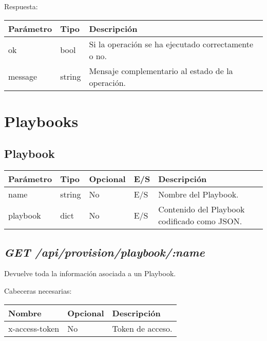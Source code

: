 Respuesta:
\begin{table}[!h]
	\centering
	\begin{adjustbox}{max width=\textwidth}
	\begin{tabular}{|l|l|l|}
		\hline
		Parámetro & Tipo & Descripción \\ \hline
		ok & bool & Si la operación se ha ejecutado correctamente o no. \\ \hline
		message & string & Mensaje complementario al estado de la operación. \\ \hline
	\end{tabular}
\end{adjustbox}
\end{table}









\section{Playbooks}

	\subsection{Playbook}
		\begin{table}[!h]
			\centering
	\begin{adjustbox}{max width=\textwidth}
			\begin{tabular}{|l|l|l|l|l|}
				\hline
				Parámetro & Tipo & Opcional & E/S & Descripción \\ \hline
				name & string & No & E/S & Nombre del Playbook. \\ \hline
				playbook & dict & No & E/S & Contenido del Playbook codificado como JSON. \\ \hline
			\end{tabular}
\end{adjustbox}
		\end{table}
	
	\subsection{\textit{GET /api/provision/playbook/:name}}
		Devuelve toda la información asociada a un Playbook.
		
		Cabeceras necesarias:
		\begin{table}[h!]
			\centering
	\begin{adjustbox}{max width=\textwidth}
			\begin{tabular}{|l|l|l|}
				\hline
				Nombre & Opcional & Descripción \\ \hline
				x-access-token & No & Token de acceso. \\ \hline
			\end{tabular}
\end{adjustbox}
		\end{table}
		
